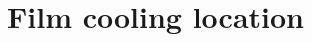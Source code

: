 \documentclass[a4paper, 11pt, oneside]{report}
\begin{document}



\chapter{Film cooling location}
\label{chapter_leading_edge}


\end{document}

